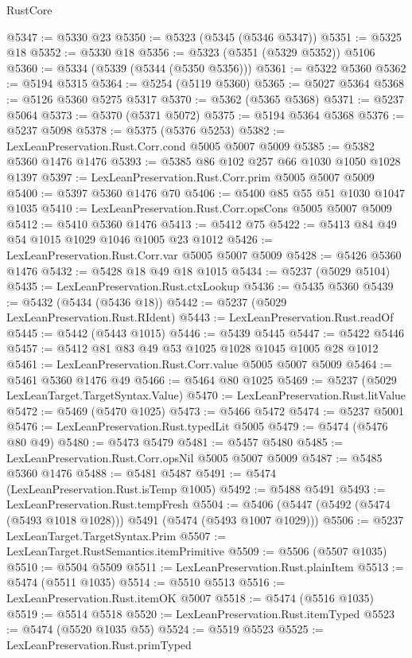 \begin{lexlean}{RustCore}
\begin{coremodule}
@5347 := @5330 @23
@5350 := @5323 (@5345 (@5346 @5347))
@5351 := @5325 @18
@5352 := @5330 @18
@5356 := @5323 (@5351 (@5329 @5352)) @5106
@5360 := @5334 (@5339 (@5344 (@5350 @5356)))
@5361 := @5322 @5360
@5362 := @5194 @5315
@5364 := @5254 (@5119 @5360)
@5365 := @5027 @5364
@5368 := @5126 @5360 @5275 @5317
@5370 := @5362 (@5365 @5368)
@5371 := @5237 @5064
@5373 := @5370 (@5371 @5072)
@5375 := @5194 @5364 @5368
@5376 := @5237 @5098
@5378 := @5375 (@5376 @5253)
@5382 := LexLeanPreservation.Rust.Corr.cond @5005 @5007 @5009
@5385 := @5382 @5360 @1476 @1476
@5393 := @5385 @86 @102 @257 @66 @1030 @1050 @1028 @1397
@5397 := LexLeanPreservation.Rust.Corr.prim @5005 @5007 @5009
@5400 := @5397 @5360 @1476 @70
@5406 := @5400 @85 @55 @51 @1030 @1047 @1035
@5410 := LexLeanPreservation.Rust.Corr.opsCons @5005 @5007 @5009
@5412 := @5410 @5360 @1476
@5413 := @5412 @75
@5422 := @5413 @84 @49 @54 @1015 @1029 @1046 @1005 @23 @1012
@5426 := LexLeanPreservation.Rust.Corr.var @5005 @5007 @5009
@5428 := @5426 @5360 @1476
@5432 := @5428 @18 @49 @18 @1015
@5434 := @5237 (@5029 @5104)
@5435 := LexLeanPreservation.Rust.ctxLookup
@5436 := @5435 @5360
@5439 := @5432 (@5434 (@5436 @18))
@5442 := @5237 (@5029 LexLeanPreservation.Rust.RIdent)
@5443 := LexLeanPreservation.Rust.readOf
@5445 := @5442 (@5443 @1015)
@5446 := @5439 @5445
@5447 := @5422 @5446
@5457 := @5412 @81 @83 @49 @53 @1025 @1028 @1045 @1005 @28 @1012
@5461 := LexLeanPreservation.Rust.Corr.value @5005 @5007 @5009
@5464 := @5461 @5360 @1476 @49
@5466 := @5464 @80 @1025
@5469 := @5237 (@5029 LexLeanTarget.TargetSyntax.Value)
@5470 := LexLeanPreservation.Rust.litValue
@5472 := @5469 (@5470 @1025)
@5473 := @5466 @5472
@5474 := @5237 @5001
@5476 := LexLeanPreservation.Rust.typedLit @5005
@5479 := @5474 (@5476 @80 @49)
@5480 := @5473 @5479
@5481 := @5457 @5480
@5485 := LexLeanPreservation.Rust.Corr.opsNil @5005 @5007 @5009
@5487 := @5485 @5360 @1476
@5488 := @5481 @5487
@5491 := @5474 (LexLeanPreservation.Rust.isTemp @1005)
@5492 := @5488 @5491
@5493 := LexLeanPreservation.Rust.tempFresh
@5504 := @5406 (@5447 (@5492 (@5474 (@5493 @1018 @1028))) @5491 (@5474 (@5493 @1007 @1029)))
@5506 := @5237 LexLeanTarget.TargetSyntax.Prim
@5507 := LexLeanTarget.RustSemantics.itemPrimitive
@5509 := @5506 (@5507 @1035)
@5510 := @5504 @5509
@5511 := LexLeanPreservation.Rust.plainItem
@5513 := @5474 (@5511 @1035)
@5514 := @5510 @5513
@5516 := LexLeanPreservation.Rust.itemOK @5007
@5518 := @5474 (@5516 @1035)
@5519 := @5514 @5518
@5520 := LexLeanPreservation.Rust.itemTyped
@5523 := @5474 (@5520 @1035 @55)
@5524 := @5519 @5523
@5525 := LexLeanPreservation.Rust.primTyped

\end{coremodule}
\end{lexlean}
